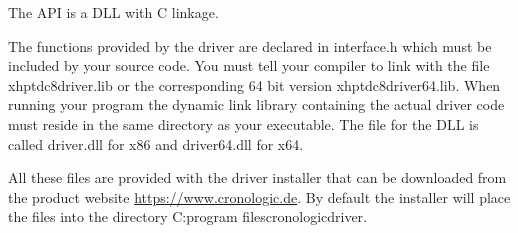 
The API is a DLL with C linkage.\par

The functions provided by the driver are declared in \textsf{\tu interface.h} 
which must be included by your source code.
You must tell your compiler to link with the file \textsf{xhptdc8\tu driver.lib} 
or the corresponding 64 bit version \textsf{xhptdc8\tu driver\tu 64.lib}.
When running your program the dynamic link library containing the actual driver code must reside in the same directory as your executable. 
The file for the DLL is called \textsf{\prefix driver.dll} for x86 and \textsf{\prefix driver\tu 64.dll} for x64.

All these files are provided with the driver installer that can be downloaded from the product website \url{https://www.cronologic.de}. 
By default the installer will place the files into the directory 
\textsf{C:\filesep program files\filesep cronologic\filesep \deviceName\filesep driver}.


 

